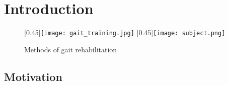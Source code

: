 \chapter{Introduction}

%
%
\begin{figure}
	\centering
	[0.45\textwidth]{\texttt{[image: gait\_training.jpg]}}%
	\hfill
	[0.45\textwidth]{\texttt{[image: subject.png]}}%
	\caption{Methods of gait rehabilitation}
\end{figure}

\section{Motivation}
%

